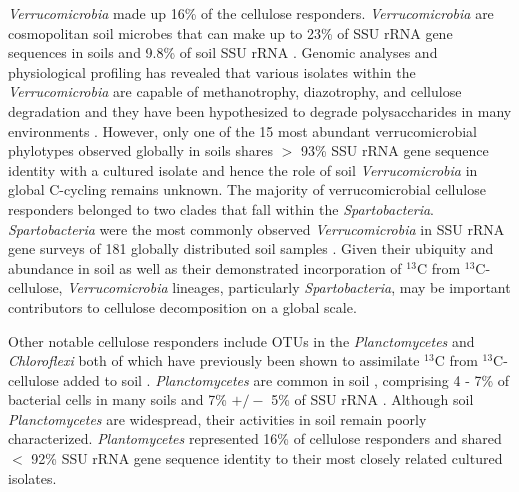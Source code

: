 \textit{Verrucomicrobia} made up 16\% of the cellulose responders.
\textit{Verrucomicrobia} are cosmopolitan soil microbes \citep{Bergmann_2011}
that can make up to 23\% of SSU rRNA gene sequences in soils
\citep{Bergmann_2011} and 9.8\% of soil SSU rRNA \citep{Buckley_2001}. Genomic
analyses and physiological profiling has revealed that various isolates within
the \textit{Verrucomicrobia} are capable of methanotrophy, diazotrophy, and
cellulose degradation \citep{Wertz_2011,Otsuka_2012} and they have been
hypothesized to degrade polysaccharides in many environments
\citep{Fierer_2013,10543821,Herlemann_2013}. However, only one of the
15 most abundant verrucomicrobial phylotypes observed globally in soils shares
$>$ 93\% SSU rRNA gene sequence identity with a cultured isolate \citep{Bergmann_2011} and hence
the role of soil \textit{Verrucomicrobia} in global C-cycling remains unknown.
The majority of verrucomicrobial cellulose responders belonged to two clades
that fall within the \textit{Spartobacteria}. \textit{Spartobacteria} were the
most commonly observed \textit{Verrucomicrobia} in SSU rRNA gene surveys of
181 globally distributed soil samples \citep{Bergmann_2011}. Given their ubiquity and abundance
in soil as well as their demonstrated incorporation of $^{13}$C from
$^{13}$C-cellulose, \textit{Verrucomicrobia} lineages, particularly
\textit{Spartobacteria}, may be important contributors to cellulose
decomposition on a global scale. 

Other notable cellulose responders include OTUs in the \textit{Planctomycetes}
and \textit{Chloroflexi} both of which have previously been shown to
assimilate $^{13}$C from $^{13}$C-cellulose added to soil
\citep{Schellenberger_2010}. \textit{Planctomycetes} are common in soil
\citep{Jannsen2006}, comprising 4 - 7\% of bacterial cells in many soils
\citep{Zarda_1997,Chatzinotas_1998} and 7\% $+/-$ 5\% of SSU rRNA
\citep{buckley_2003}. Although soil \textit{Planctomycetes} are widespread,
their activities in soil remain poorly characterized. \textit{Plantomycetes}
represented 16\% of cellulose responders and shared $<$ 92\% SSU rRNA gene
sequence identity to their most closely related cultured isolates.

